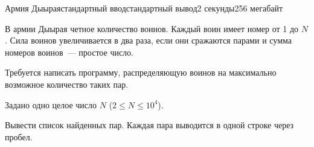 \begin{problem}{Армия Дыырая}{стандартный ввод}{стандартный вывод}{2 секунды}{256 мегабайт}

В армии Дыырая четное количество воинов. Каждый воин имеет номер от 1 до $N$. Сила воинов увеличивается в два раза, если они сражаются парами и сумма номеров воинов~--- простое число.

Требуется написать программу, распределяющую воинов на максимально возможное количество таких пар.

\InputFile
Задано одно целое число $N$ ($2 \leq N \leq 10^4$).

\OutputFile
Вывести список найденных пар. Каждая пара выводится в одной строке через пробел.

\Example

\begin{example}
%
\end{example}

\end{problem}

